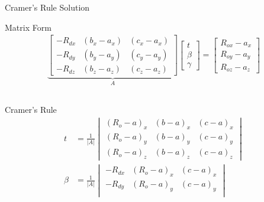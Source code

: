 \begin{frame}{Cramer's Rule Solution}
    \begin{mathbox}{Matrix Form}
        \vspace{-0.5cm}
        \small
        \begin{align*}
            \underbrace{
                \begin{bmatrix}
                    -R_{dx} & (b_x-a_x) & (c_x-a_x) \\
                    -R_{dy} & (b_y-a_y) & (c_y-a_y) \\
                    -R_{dz} & (b_z-a_z) & (c_z-a_z)
                \end{bmatrix}
            }_{A}
            \begin{bmatrix}
                t \\ \beta \\ \gamma
            \end{bmatrix}
            =
            \begin{bmatrix}
                R_{ox} - a_x \\
                R_{oy} - a_y \\
                R_{oz} - a_z
            \end{bmatrix}
        \end{align*}
    \end{mathbox}
    \vspace{-0.1cm}
    \pause
    \begin{columns}
        \begin{column}{0.6\textwidth}
            \begin{mathbox}{Cramer's Rule}
                \vspace{-0.3cm}
                \footnotesize
                \begin{align*}
                    t &= \frac{1}{|A|} \begin{vmatrix}
                        (R_o-a)_x & (b-a)_x & (c-a)_x \\
                        (R_o-a)_y & (b-a)_y & (c-a)_y \\
                        (R_o-a)_z & (b-a)_z & (c-a)_z
                    \end{vmatrix} \\
                    \beta &= \frac{1}{|A|} \begin{vmatrix}
                        -R_{dx} & (R_o-a)_x & (c-a)_x \\
                        -R_{dy} & (R_o-a)_y & (c-a)_y \\

\end{vmatrix}
\end{align*}
\end{mathbox}
\end{column}
\end{columns}
\end{frame}
